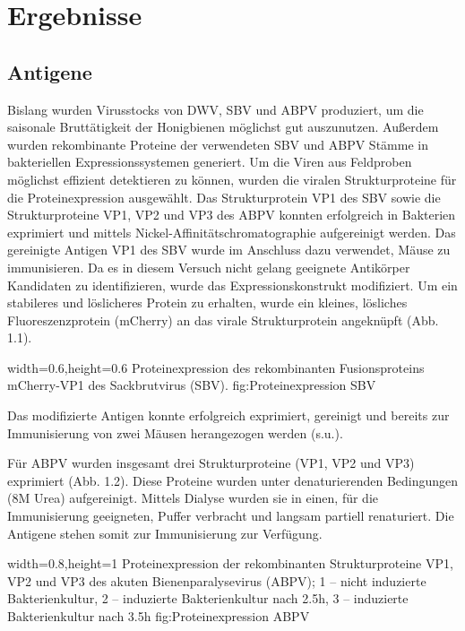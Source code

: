 \section{Ergebnisse}

\subsection{Antigene}

Bislang wurden Virusstocks von DWV, SBV und ABPV produziert, um die saisonale Bruttätigkeit der Honigbienen möglichst gut auszunutzen. Außerdem wurden rekombinante Proteine der verwendeten SBV und ABPV Stämme in bakteriellen Expressionssystemen generiert. Um die Viren aus Feldproben möglichst effizient detektieren zu können, wurden die viralen Strukturproteine für die Proteinexpression ausgewählt. 
Das Strukturprotein VP1 des SBV sowie die Strukturproteine VP1, VP2 und VP3 des ABPV konnten erfolgreich in Bakterien exprimiert und mittels Nickel-Affinitätschromatographie aufgereinigt werden. Das gereinigte Antigen VP1 des SBV wurde im Anschluss dazu verwendet, Mäuse zu immunisieren. Da es in diesem Versuch nicht gelang geeignete Antikörper Kandidaten zu identifizieren, wurde das Expressionskonstrukt modifiziert. Um ein stabileres und löslicheres Protein zu erhalten, wurde ein kleines, lösliches Fluoreszenzprotein (mCherry) an das virale Strukturprotein angeknüpft (Abb. 1.1).

{width=0.6\textwidth,height=0.6\textheight}
{Proteinexpression des rekombinanten Fusionsproteins mCherry-VP1 des Sackbrutvirus (SBV).}%
{}%
{fig:Proteinexpression SBV}%

Das modifizierte Antigen konnte erfolgreich exprimiert, gereinigt und bereits zur Immunisierung von zwei Mäusen herangezogen werden (s.u.). 

Für ABPV wurden insgesamt drei Strukturproteine (VP1, VP2 und VP3) exprimiert (Abb. 1.2). Diese Proteine wurden unter denaturierenden Bedingungen (8M Urea) aufgereinigt. Mittels Dialyse wurden sie in einen, für die Immunisierung geeigneten, Puffer verbracht und langsam partiell renaturiert. Die Antigene stehen somit zur Immunisierung zur Verfügung.

{width=0.8\textwidth,height=1\textheight}
{Proteinexpression der rekombinanten Strukturproteine VP1, VP2 und VP3 des akuten Bienenparalysevirus (ABPV); 1 – nicht induzierte Bakterienkultur, 2 – induzierte Bakterienkultur nach 2.5h, 3 – induzierte Bakterienkultur nach 3.5h
}%
{}%
{fig:Proteinexpression ABPV}%

